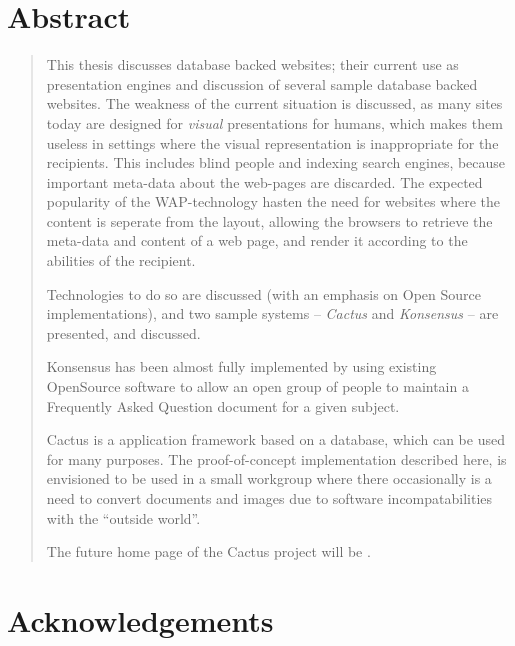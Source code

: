 \maketitle

\section*{Abstract}
\label{sec:abstract}


\begin{quote}
  This thesis discusses database backed websites; their current use as
  presentation engines and discussion of several sample database
  backed websites.  The weakness of the current situation is
  discussed, as many sites today are designed for \textit{visual}
  presentations for humans, which makes them useless in settings where
  the visual representation is inappropriate for the recipients.  This
  includes blind people and indexing search engines, because important
  meta-data about the web-pages are discarded.  The expected
  popularity of the WAP-technology hasten the need for websites where
  the content is seperate from the layout, allowing the browsers to
  retrieve the meta-data and content of a web page, and render it
  according to the abilities of the recipient.
  
  Technologies to do so are discussed (with an emphasis on Open Source
  implementations), and two sample systems -- \textit{Cactus} and
  \textit{Konsensus} -- are presented, and discussed.
  
  Konsensus has been almost fully implemented by using existing
  OpenSource software to allow an open group of people to maintain a
  Frequently Asked Question document for a given subject.

  Cactus is a application framework based on a database, which can be
  used for many purposes.  The proof-of-concept implementation
  described here, is envisioned to be used in a small workgroup where
  there occasionally is a need to convert documents and images due to
  software incompatabilities with the ``outside world''.

  The future home page of the Cactus project will be
  .
\end{quote}


\section*{Acknowledgements}

